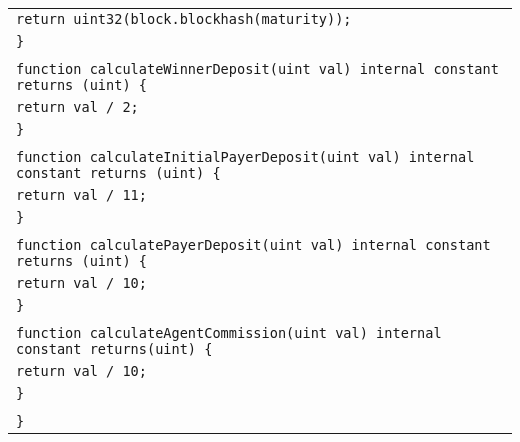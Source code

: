 \documentclass[a4paper]{article}
\begin{document}
\begin{tabularx}{\linewidth}{l}
        \\
        \qquad\qquad\texttt{return uint32(block.blockhash(maturity));}\\
        \qquad\texttt{\}}\\
        \\
        \qquad\texttt{function calculateWinnerDeposit(uint val) internal constant returns (uint) \{}\\
        \qquad\qquad\texttt{return val / 2;}\\
        \qquad\texttt{\}}\\
        \\
        \qquad\texttt{function calculateInitialPayerDeposit(uint val) internal constant returns (uint) \{}\\
        \qquad\qquad\texttt{return val / 11;}\\
        \qquad\texttt{\}}\\
        \\
        \qquad\texttt{function calculatePayerDeposit(uint val) internal constant returns (uint) \{}\\
        \qquad\qquad\texttt{return val / 10;}\\
        \qquad\texttt{\}}\\
        \\
        \qquad\texttt{function calculateAgentCommission(uint val) internal constant returns(uint) \{}\\
        \qquad\qquad\texttt{return val / 10;}\\
        \qquad\texttt{\}}\\
        \\
        \texttt{\}}\\
    \end{tabularx}
\end{document}
